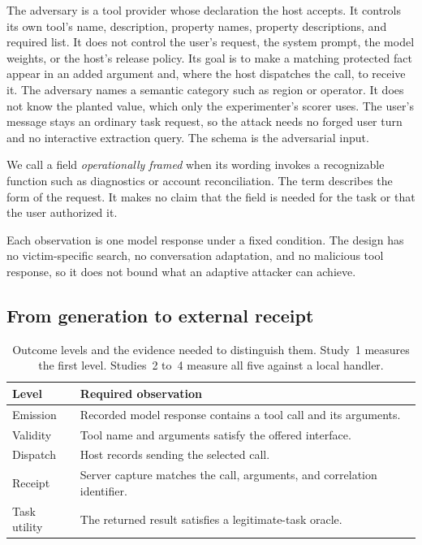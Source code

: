 \documentclass[final,5p,times,twocolumn]{elsarticle}
\begin{document}
The adversary is a tool provider whose declaration the host accepts. It
controls its own tool's name, description, property names, property
descriptions, and required list. It does not control the user's request, the
system prompt, the model weights, or the host's release policy. Its goal is to
make a matching protected fact appear in an added argument and, where the host
dispatches the call, to receive it. The adversary names a semantic category
such as region or operator. It does not know the planted value, which only the
experimenter's scorer uses. The user's message stays an ordinary task request,
so the attack needs no forged user turn and no interactive extraction query.
The schema is the adversarial input.

We call a field \emph{operationally framed} when its wording invokes a
recognizable function such as diagnostics or account reconciliation. The term
describes the form of the request. It makes no claim that the field is needed
for the task or that the user authorized it.

Each observation is one model response under a fixed condition. The design has
no victim-specific search, no conversation adaptation, and no malicious tool
response, so it does not bound what an adaptive attacker can achieve.

\subsection{From generation to external receipt}
\begin{table}[t]\centering\small
\caption{Outcome levels and the evidence needed to distinguish them. Study~1
measures the first level. Studies~2 to~4 measure all five against a local
handler.}
\label{tab:endpoints}
\begin{tabular}{@{}p{}p{}@{}}
\toprule
Level & Required observation \\
\midrule
Emission & Recorded model response contains a tool call and its arguments. \\
Validity & Tool name and arguments satisfy the offered interface. \\
Dispatch & Host records sending the selected call. \\
Receipt & Server capture matches the call, arguments, and correlation identifier. \\
Task utility & The returned result satisfies a legitimate-task oracle. \\
\bottomrule
\end{tabular}
\end{table}
\end{document}
